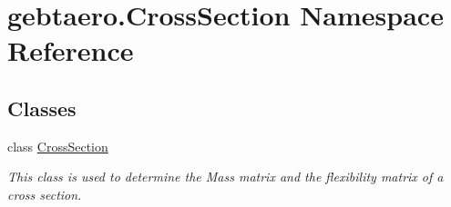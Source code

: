\hypertarget{namespacegebtaero_1_1_cross_section}{}\section{gebtaero.\+Cross\+Section Namespace Reference}
\label{namespacegebtaero_1_1_cross_section}
\subsection*{Classes}
\begin{DoxyCompactItemize}
\item 
class \hyperlink{classgebtaero_1_1_cross_section_1_1_cross_section}{Cross\+Section}
\begin{DoxyCompactList}\small\item\em This class is used to determine the Mass matrix and the flexibility matrix of a cross section. \end{DoxyCompactList}\end{DoxyCompactItemize}
